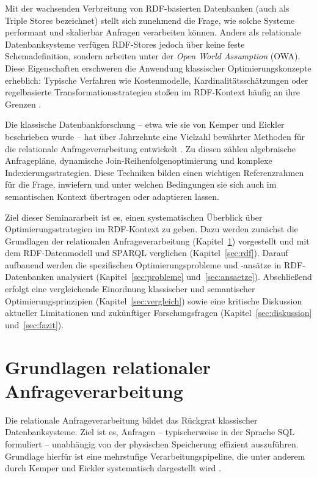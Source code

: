 \documentclass[12pt]{article}
\begin{document}
Mit der wachsenden Verbreitung von RDF-basierten Datenbanken (auch als Triple Stores bezeichnet) stellt sich zunehmend die Frage, wie solche Systeme performant und skalierbar Anfragen verarbeiten können. Anders als relationale Datenbanksysteme verfügen RDF-Stores jedoch über keine feste Schemadefinition, sondern arbeiten unter der \textit{Open World Assumption} (OWA). Diese Eigenschaften erschweren die Anwendung klassischer Optimierungskonzepte erheblich: Typische Verfahren wie Kostenmodelle, Kardinalitätsschätzungen oder regelbasierte Transformationsstrategien stoßen im RDF-Kontext häufig an ihre Grenzen \cite{wylot2018rdf, ycy2015}.

Die klassische Datenbankforschung – etwa wie sie von Kemper und Eickler beschrieben wurde – hat über Jahrzehnte eine Vielzahl bewährter Methoden für die relationale Anfrageverarbeitung entwickelt \cite{kemper2022datenbanksysteme}. Zu diesen zählen algebraische Anfragepläne, dynamische Join-Reihenfolgenoptimierung und komplexe Indexierungsstrategien. Diese Techniken bilden einen wichtigen Referenzrahmen für die Frage, inwiefern und unter welchen Bedingungen sie sich auch im semantischen Kontext übertragen oder adaptieren lassen.

Ziel dieser Seminararbeit ist es, einen systematischen Überblick über Optimierungsstrategien im RDF-Kontext zu geben. Dazu werden zunächst die Grundlagen der relationalen Anfrageverarbeitung (Kapitel~\ref{sec:relational}) vorgestellt und mit dem RDF-Datenmodell und SPARQL verglichen (Kapitel~\ref{sec:rdf}). Darauf aufbauend werden die spezifischen Optimierungsprobleme und -ansätze in RDF-Datenbanken analysiert (Kapitel~\ref{sec:probleme} und~\ref{sec:ansaetze}). Abschließend erfolgt eine vergleichende Einordnung klassischer und semantischer Optimierungsprinzipien (Kapitel~\ref{sec:vergleich}) sowie eine kritische Diskussion aktueller Limitationen und zukünftiger Forschungsfragen (Kapitel~\ref{sec:diskussion} und~\ref{sec:fazit}).


\section{Grundlagen relationaler Anfrageverarbeitung}\label{sec:relational}

Die relationale Anfrageverarbeitung bildet das Rückgrat klassischer Datenbanksysteme. Ziel ist es, Anfragen – typischerweise in der Sprache SQL formuliert – unabhängig von der physischen Speicherung effizient auszuführen. Grundlage hierfür ist eine mehrstufige Verarbeitungspipeline, die unter anderem durch Kemper und Eickler systematisch dargestellt wird \cite{kemper2022datenbanksysteme}.
\end{document}

